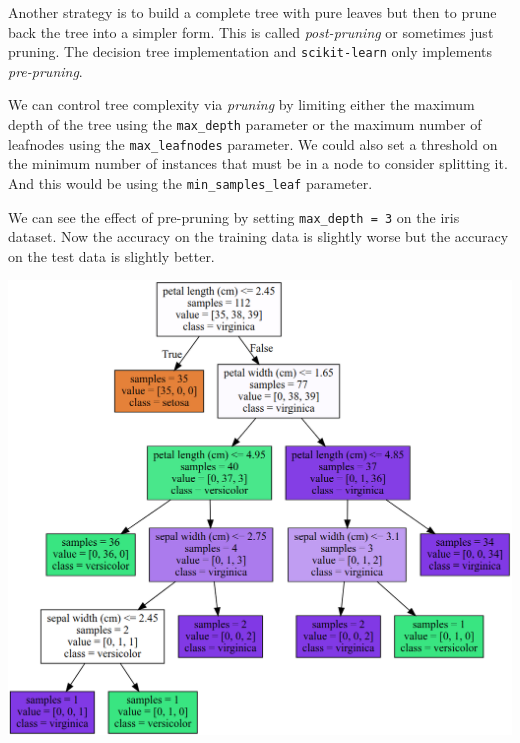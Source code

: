 \begin{multicols}{2}
Another strategy is to build a complete tree with pure leaves but then to prune back the tree into a simpler form. This is called \emph{post-pruning} or sometimes just pruning. The decision tree implementation and \texttt{scikit-learn} only implements \emph{pre-pruning}. 

We can control tree complexity via \emph{pruning} by limiting either the maximum depth of the tree using the \texttt{max_depth} parameter or the maximum number of leafnodes using the \texttt{max_leafnodes} parameter. We could also set a threshold on the minimum number of instances that must be in a node to consider splitting it. And this would be using the \texttt{min_samples_leaf} parameter. 

We can see the effect of pre-pruning by setting \texttt{max_depth = 3} on the iris dataset. Now the accuracy on the training data is slightly worse but the accuracy on the test data is slightly better. 


\end{multicols}
\begin{center}
	\includegraphics[width=\linewidth]{img/Decision-Tree-3.png} 
\end{center}
